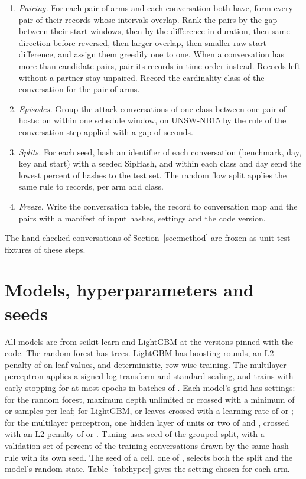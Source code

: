 \begin{enumerate}
\item \emph{Pairing.} For each pair of arms and each conversation both have, form every pair of their records whose intervals overlap. Rank the pairs by the gap between their start windows, then by the difference in duration, then same direction before reversed, then larger overlap, then smaller raw start difference, and assign them greedily one to one. When a conversation has more than  candidate pairs, pair its records in time order instead. Records left without a partner stay unpaired. Record the cardinality class of the conversation for the pair of arms.
\item \emph{Episodes.} Group the attack conversations of one class between one pair of hosts: on \cicids{} within one schedule window, on UNSW-NB15 by the rule of the conversation step applied with a gap of  seconds.
\item \emph{Splits.} For each seed, hash an identifier of each conversation (benchmark, day, key and start) with a seeded SipHash, and within each class and day send the lowest \SetTestPct{} percent of hashes to the test set. The random flow split applies the same rule to records, per arm and class.
\item \emph{Freeze.} Write the conversation table, the record to conversation map and the pairs with a manifest of input hashes, settings and the code version.
\end{enumerate}

The \NhandCases{} hand-checked conversations of Section~\ref{sec:method} are frozen as unit test fixtures of these steps.

\section{Models, hyperparameters and seeds}\label{app:models}

All models are from scikit-learn and LightGBM at the versions pinned with the code. The random forest has  trees. LightGBM has  boosting rounds, an L2 penalty of  on leaf values, and deterministic, row-wise training. The multilayer perceptron applies a signed log transform and standard scaling, and trains with early stopping for at most  epochs in batches of . Each model's grid has \SetGridSize{} settings: for the random forest, maximum depth unlimited or  crossed with a minimum of  or  samples per leaf; for LightGBM,  or  leaves crossed with a learning rate of  or ; for the multilayer perceptron, one hidden layer of  units or two of  and , crossed with an L2 penalty of  or . Tuning uses seed  of the grouped split, with a validation set of \SetValPct{} percent of the training conversations drawn by the same hash rule with its own seed. The seed of a cell, one of \SetSeeds{}, selects both the split and the model's random state. Table~\ref{tab:hyper} gives the setting chosen for each arm.

